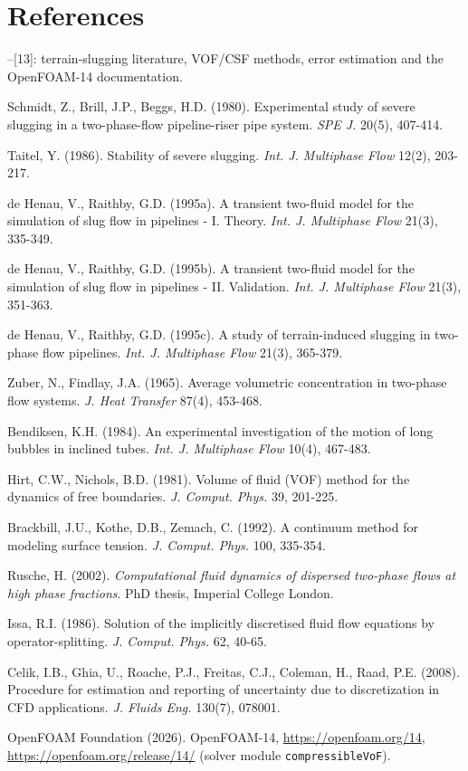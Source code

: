 \documentclass[11pt,english]{article}
\begin{document}
\section*{References}\label{references}

\noindent [1]--[13]: terrain-slugging literature, VOF/CSF methods, error
estimation and the OpenFOAM-14 documentation.

\medskip

\begin{description}\setlength{\itemsep}{2pt}
\item[{[1]}] Schmidt, Z., Brill, J.P., Beggs, H.D. (1980). Experimental study
of severe slugging in a two-phase-flow pipeline-riser pipe system.
\emph{SPE J.} 20(5), 407-414.
\item[{[2]}] Taitel, Y. (1986). Stability of
severe slugging. \emph{Int. J. Multiphase Flow} 12(2), 203-217.
\item[{[3]}] de Henau, V., Raithby, G.D. (1995a). A transient two-fluid model for the
simulation of slug flow in pipelines - I. Theory. \emph{Int. J.
Multiphase Flow} 21(3), 335-349.
\item[{[4]}] de Henau, V., Raithby, G.D.
(1995b). A transient two-fluid model for the simulation of slug flow in
pipelines - II. Validation. \emph{Int. J. Multiphase Flow} 21(3),
351-363.
\item[{[5]}] de Henau, V., Raithby, G.D. (1995c). A study of
terrain-induced slugging in two-phase flow pipelines. \emph{Int. J.
Multiphase Flow} 21(3), 365-379.
\item[{[6]}] Zuber, N., Findlay, J.A.
(1965). Average volumetric concentration in two-phase flow systems.
\emph{J. Heat Transfer} 87(4), 453-468.
\item[{[7]}] Bendiksen, K.H. (1984). An experimental investigation of the
motion of long bubbles in inclined tubes. \emph{Int. J. Multiphase Flow}
10(4), 467-483.
\item[{[8]}] Hirt, C.W., Nichols, B.D.
(1981). Volume of fluid (VOF) method for the dynamics of free
boundaries. \emph{J. Comput. Phys.} 39, 201-225.
\item[{[9]}] Brackbill,
J.U., Kothe, D.B., Zemach, C. (1992). A continuum method for modeling
surface tension. \emph{J. Comput. Phys.} 100, 335-354.
\item[{[10]}] Rusche,
H. (2002). \emph{Computational fluid dynamics of dispersed two-phase
flows at high phase fractions}. PhD thesis, Imperial College London.
\item[{[11]}] Issa, R.I. (1986). Solution of the implicitly discretised fluid
flow equations by operator-splitting. \emph{J. Comput. Phys.} 62, 40-65.
\item[{[12]}] Celik, I.B., Ghia, U., Roache, P.J., Freitas, C.J., Coleman,
H., Raad, P.E. (2008). Procedure for estimation and reporting of
uncertainty due to discretization in CFD applications. \emph{J. Fluids
Eng.} 130(7), 078001.
\item[{[13]}] OpenFOAM Foundation (2026). OpenFOAM-14,
\url{https://openfoam.org/14}, \url{https://openfoam.org/release/14/} (solver module \texttt{compressibleVoF}).
\end{description}
\end{document}

